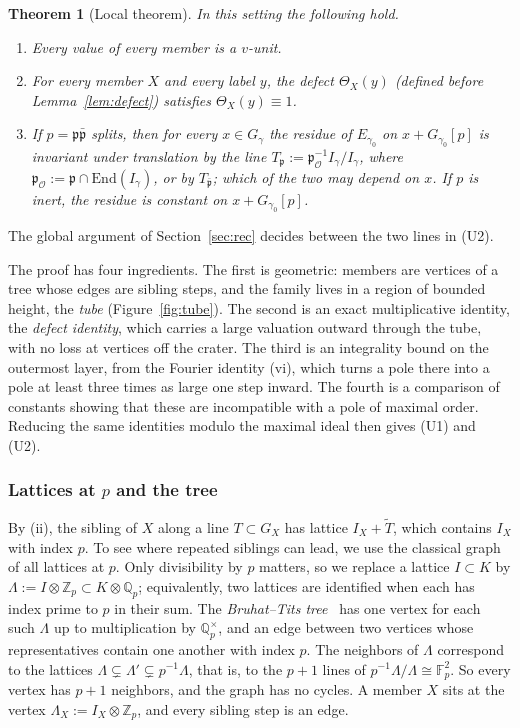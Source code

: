 \documentclass[11pt]{amsart}
\numberwithin{equation}{section}
\theoremstyle{plain}
\newtheorem{theorem}{Theorem}[section]
\theoremstyle{definition}
\theoremstyle{remark}
\begin{document}
\begin{theorem}[Local theorem]\label{thm:local}
In this setting the following hold.
\begin{enumerate}
\item[(U0)] Every value of every member is a \(v\)-unit.
\item[(U1)] For every member \(X\) and every label \(y\), the defect \(\Theta_X(y)\) (defined before Lemma~\ref{lem:defect}) satisfies \(\Theta_X(y)\equiv1\).
\item[(U2)] If \(p=\mathfrak p\bar{\mathfrak p}\) splits, then for every \(x\in G_\gamma\) the residue of \(E_{\gamma_0}\) on \(x+G_{\gamma_0}[p]\) is invariant under translation by the line \(T_{\mathfrak p}:=\mathfrak p_{\mathcal O}^{-1}I_\gamma/I_\gamma\), where \(\mathfrak p_{\mathcal O}:=\mathfrak p\cap\mathrm{End}(I_\gamma)\), or by \(T_{\bar{\mathfrak p}}\); which of the two may depend on \(x\). If \(p\) is inert, the residue is constant on \(x+G_{\gamma_0}[p]\).
\end{enumerate}
\end{theorem}

The global argument of Section~\ref{sec:rec} decides between the two lines in (U2).

The proof has four ingredients. The first is geometric: members are vertices of a tree whose edges are sibling steps, and the family lives in a region of bounded height, the \emph{tube} (Figure~\ref{fig:tube}). The second is an exact multiplicative identity, the \emph{defect identity}, which carries a large valuation outward through the tube, with no loss at vertices off the crater. The third is an integrality bound on the outermost layer, from the Fourier identity (vi), which turns a pole there into a pole at least three times as large one step inward. The fourth is a comparison of constants showing that these are incompatible with a pole of maximal order. Reducing the same identities modulo the maximal ideal then gives (U1) and (U2).

\subsubsection*{Lattices at \(p\) and the tree}
By (ii), the sibling of \(X\) along a line \(T\subset G_X\) has lattice \(I_X+\widetilde T\), which contains \(I_X\) with index \(p\). To see where repeated siblings can lead, we use the classical graph of all lattices at \(p\). Only divisibility by \(p\) matters, so we replace a lattice \(I\subset K\) by \(\Lambda:=I\otimes\mathbb Z_p\subset K\otimes\mathbb Q_p\); equivalently, two lattices are identified when each has index prime to \(p\) in their sum. The \emph{Bruhat--Tits tree}~\cite{Se} has one vertex for each such \(\Lambda\) up to multiplication by \(\mathbb Q_p^\times\), and an edge between two vertices whose representatives contain one another with index \(p\). The neighbors of \(\Lambda\) correspond to the lattices \(\Lambda\subsetneq\Lambda'\subsetneq p^{-1}\Lambda\), that is, to the \(p+1\) lines of \(p^{-1}\Lambda/\Lambda\cong\mathbb F_p^2\). So every vertex has \(p+1\) neighbors, and the graph has no cycles. A member \(X\) sits at the vertex \(\Lambda_X:=I_X\otimes\mathbb Z_p\), and every sibling step is an edge.
\end{document}
